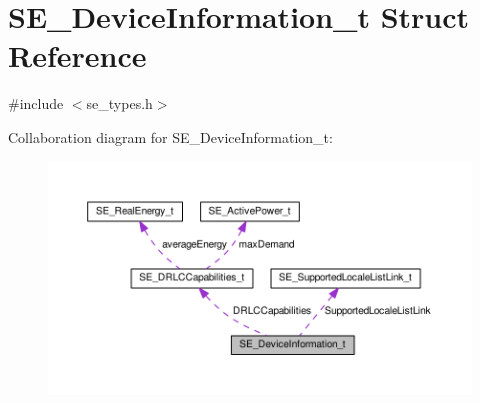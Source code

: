 \hypertarget{structSE__DeviceInformation__t}{}\section{S\+E\+\_\+\+Device\+Information\+\_\+t Struct Reference}
\label{structSE__DeviceInformation__t}


{\ttfamily \#include $<$se\+\_\+types.\+h$>$}



Collaboration diagram for S\+E\+\_\+\+Device\+Information\+\_\+t\+:\nopagebreak
\begin{figure}[H]
\begin{center}
\leavevmode
\includegraphics[width=350pt]{structSE__DeviceInformation__t__coll__graph}
\end{center}
\end{figure}
